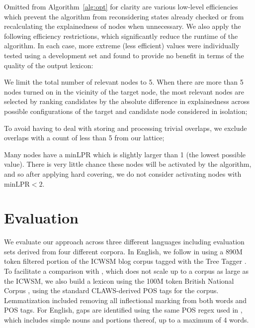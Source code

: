 \documentclass[11pt,letterpaper]{article}
\newcommand{\minLPR}{\ensuremath{\text{minLPR}}}
\newcommand{\algoref}[2][]{Algorithm#1~\ref{#2}\xspace}
\begin{document}
Omitted from \algoref{alg:opt} for clarity are various low-level efficiencies which prevent the algorithm from reconsidering states already checked or from recalculating the explainedness of nodes when unnecessary. We also apply the following efficiency restrictions, which significantly reduce the runtime of the algorithm. In each case, more extreme (less efficient) values were individually tested using a development set and found to provide no benefit in terms of the quality of the output lexicon:
\begin{compactitem}
\item We limit the total number of relevant nodes to 5. When there are more than 5 nodes turned on in the vicinity of the target node, the most relevant nodes are selected by ranking candidates by the absolute difference in explainedness across possible configurations of the target and candidate node considered in isolation;
\item To avoid having to deal with storing and processing trivial overlaps, we exclude overlaps with a count of less than 5 from our lattice;
\item Many nodes have a minLPR which is slightly larger than 1 (the lowest possible value). There is very little chance these nodes will be activated by the algorithm, and so after applying hard covering, we do not consider activating nodes with $\minLPR < 2$.
\end{compactitem}

\section{Evaluation}
\label{sec:evaluation}

We evaluate our approach across three different languages including evaluation sets derived from four different corpora. In English, we follow  in using a 890M token filtered portion of the ICWSM blog corpus \cite{ICWSM} tagged with the Tree Tagger \cite{Schmid95}. To facilitate a comparison with , which does not scale up to a corpus as large as the ICWSM, we also build a lexicon using the 100M token British National Corpus \cite{BNC}, using the standard CLAWS-derived POS tags for the corpus. Lemmatization included removing all inflectional marking from both words and POS tags. For English, gaps are identified using the same POS regex used in , which includes simple nouns and portions thereof, up to a maximum of 4 words.
\end{document}
